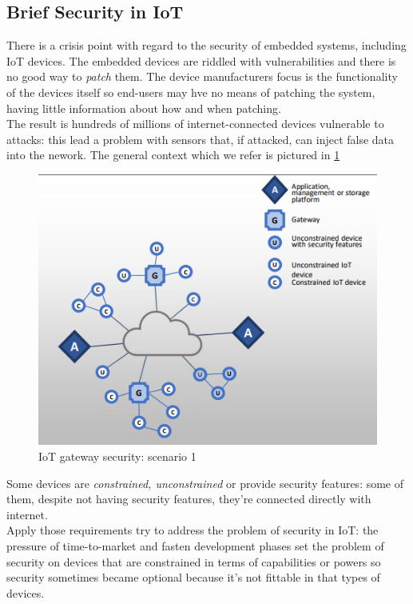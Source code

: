 \documentclass[10pt,a4paper]{report}
\theoremstyle{definition}
\begin{document}
\subsection{Brief Security in IoT}\label{sec:brief-security-in-iot}
There is a crisis point with regard to the security of embedded systems, including IoT devices. The embedded devices are riddled with vulnerabilities and there is no good way to \textit{patch} them. The device manufacturers focus is the functionality of the devices itself so end-users may hve no means of patching the system, having little information about how and when patching.\\
The result is hundreds of millions of internet-connected devices vulnerable to attacks: this lead a problem with sensors that, if attacked, can inject false data into the nework. 
The general context which we refer is pictured in \ref{security-scenario1}
\begin{figure}[h]
	\centering
	\includegraphics[scale=0.90]{images/Pasted image 20230228114543.png}
	\caption{IoT gateway security: scenario 1}
	\label{security-scenario1}
\end{figure}
Some devices are \textit{constrained, unconstrained} or provide security features: some of them, despite not having security features, they're connected directly with internet.\\
Apply those requirements try to address the problem of security in IoT: the pressure of time-to-market and fasten development phases set the problem of security on devices that are constrained in terms of capabilities or powers so security sometimes became optional because it's not fittable in that types of devices.\\
\end{document}
